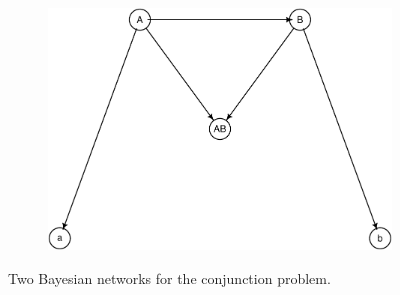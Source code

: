 \documentclass[
  10pt,
  dvipsnames,enabledeprecatedfontcommands]{scrartcl}
\begin{document}
\begin{figure}[H]
\hspace{2mm} 
\hspace{5mm}\begin{subfigure}[!ht]{0.45\textwidth}
\vspace{1mm}

\begin{center}\includegraphics[width=1\linewidth]{conjunction-appendix_files/figure-latex/unnamed-chunk-3-1} \end{center}
\end{subfigure}
\normalsize
\caption{Two Bayesian networks for the conjunction problem.}
\label{fig:conjunctionBNs}
\end{figure}
\end{document}
